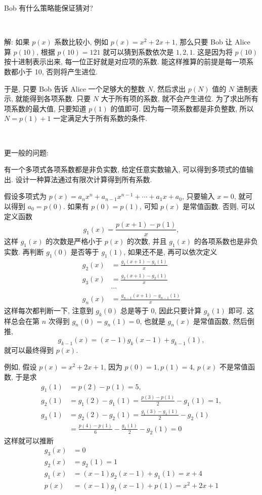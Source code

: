 Bob 有什么策略能保证猜对?

~

解: 如果 $p(x)$ 系数比较小, 例如 $p(x) = x^2 + 2x + 1$, 那么只要 Bob 让 Alice 算 $p(10)$, 根据 $p(10) = 121$ 就可以猜到系数依次是 $1,2,1$. 这是因为将 $p(10)$ 按十进制表示出来, 每一位正好就是对应项的系数. 能这样推算的前提是每一项系数都小于 10, 否则将产生进位. 

于是, 只要 Bob 告诉 Alice 一个足够大的整数 $N$, 然后求出 $p(N)$ 值的 $N$ 进制表示, 就能得到各项系数. 只要 $N$ 大于所有项的系数, 就不会产生进位. 为了求出所有项系数的最大值, 只要知道 $p(1)$ 的值即可. 因为每一项系数都是非负整数, 所以 $N = p(1) + 1$ 一定满足大于所有系数的条件.

~

\noindent 更一般的问题:

有一个多项式各项系数都是非负实数, 给定任意实数输入, 可以得到多项式的值输出. 设计一种算法通过有限次计算得到所有系数.

假设多项式为 $p(x) = a_nx^n + a_{n-1}x^{n-1} + \cdots + a_1x + a_0$, 只要输入 $x = 0$, 就可以得到 $a_0 = p(0)$. 如果有 $p(0) = p(1)$, 可知 $p(x)$ 是常值函数. 否则, 可以定义函数 
$$g_1(x) = \frac{p(x+1) - p(1)}{x} ,$$ 
这样 $g_1(x)$ 的次数是严格小于 $p(x)$ 的次数, 并且 $g_1(x)$ 的各项系数也是非负实数. 再判断 $g_1(0)$ 是否等于 $g_1(1)$, 如果还不是, 再可以依次定义
\begin{align*}
g_2(x) &= \frac{g_1(x+1) - g_1(1)}{x} \\
g_3(x) &= \frac{g_2(x+1) - g_2(1)}{x} \\
& \cdots \\
g_n(x) &= \frac{g_{n-1}(x+1) - g_{n-1}(1)}{x} 
\end{align*}
这样每次都判断一下, 注意到 $g_k(0)$ 总是等于 $0$, 因此只要计算 $g_k(1)$ 即可. 这样总会在第 $n$ 次得到 $g_n(0) = g_n(1) = 0$, 也就是 $g_n(x)$ 是常值函数, 然后倒推, 
\[
g_{k-1}(x) = (x-1)g_k(x-1) + g_{k-1}(1) ,
\]
就可以最终得到 $p(x)$. 

例如, 假设 $p(x)=x^2+2x+1$, 因为 $p(0)=1, p(1)=4$, $p(x)$ 不是常值函数, 于是求 
\begin{align*}
g_1(1) &= p(2)-p(1) = 5, \\
g_2(1) &= g_1(2)-g_1(1) = \frac{p(3) - p(1)}{2} - g_1(1) = 1, \\
g_3(1) &= g_2(2)-g_2(1) = \frac{g_1(3) - g_1(1)}{2} - g_2(1) \\
&= \frac{p(4) - p(1)}{6} - \frac{g_1(1)}{2} - g_2(1) = 0
\end{align*}
这样就可以推断 
\begin{align*}
g_3(x) &= 0\\ 
g_2(x) &= g_2(1) = 1 \\
g_1(x) &= (x-1)g_2(x-1) + g_1(1) = x + 4\\
p(x) &= (x-1)g_1(x-1) + p(1) = x^2 + 2x + 1
\end{align*}


